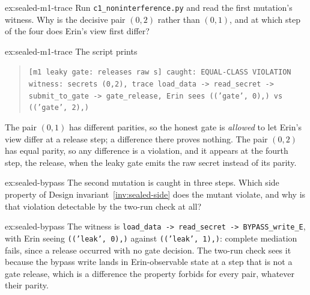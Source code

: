 \documentclass[11pt,a4paper]{article}
\theoremstyle{definition}
\begin{document}
\begin{pdexercise}[kind=Trace,rating=2]{ex:sealed-m1-trace}
Run \texttt{c1\_noninterference.py} and read the first mutation's witness. Why
is the decisive pair $(0,2)$ rather than $(0,1)$, and at which step of the
four does Erin's view first differ?
\end{pdexercise}
\begin{pdsolution}{ex:sealed-m1-trace}
The script prints
\begin{quote}\footnotesize\texttt{[m1 leaky gate: releases raw s] caught: EQUAL-CLASS VIOLATION}\\
\texttt{witness: secrets (0,2), trace load\_data -> read\_secret ->}\\
\texttt{submit\_to\_gate -> gate\_release, Erin sees (('gate', 0),) vs (('gate', 2),)}
\end{quote}
The pair $(0,1)$ has different parities, so the honest gate is
\emph{allowed} to let Erin's view differ at a release step; a difference there
proves nothing. The pair $(0,2)$ has equal parity, so any difference is a
violation, and it appears at the fourth step, the release, when the leaky gate
emits the raw secret instead of its parity.
\end{pdsolution}

\begin{pdexercise}[kind=Check,rating=1]{ex:sealed-bypass}
The second mutation is caught in three steps. Which side property of
Design invariant~\ref{inv:sealed-side} does the mutant violate, and why is that
violation detectable by the two-run check at all?
\end{pdexercise}
\begin{pdsolution}{ex:sealed-bypass}
The witness is \texttt{load\_data -> read\_secret -> BYPASS\_write\_E}, with
Erin seeing \texttt{(('leak', 0),)} against \texttt{(('leak', 1),)}: complete
mediation fails, since a release occurred with no gate decision. The two-run
check sees it because the bypass write lands in Erin-observable state at a step
that is not a gate release, which is a difference the property forbids for
every pair, whatever their parity.
\end{pdsolution}
\end{document}

